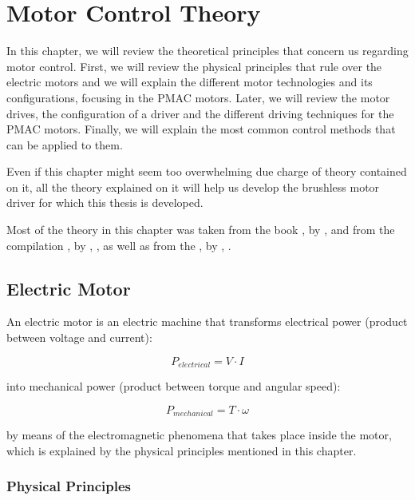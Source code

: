 \chapter{Motor Control Theory} \label{chap:theory}

In this chapter, we will review the theoretical principles that concern us regarding motor control. First, we will review the physical principles that rule over the electric motors and we will explain the different motor technologies and its configurations, focusing in the \acf{PMAC} motors. Later, we will review the motor drives, the configuration of a driver and the different driving techniques for the \ac{PMAC} motors. Finally, we will explain the most common control methods that can be applied to them.

Even if this chapter might seem too overwhelming due charge of theory contained on it, all the theory explained on it will help us develop the brushless motor driver for which this thesis is developed.

Most of the theory in this chapter was taken from the book , by \citeauthor{sistemi_di_controllo:2007}, \citeyear{sistemi_di_controllo:2007} and from the compilation , by \citeauthor{AC_drives}, \citeyear{AC_drives}, as well as from the , by \citeauthor{GhioniPowerElec}, \citeyear{GhioniPowerElec}.


\section{Electric Motor}

An electric motor is an electric machine that transforms electrical power (product between voltage and current):

\begin{equation}
	\label{eq:p_elec}
	P_{electrical} = V \cdot I
\end{equation}

into mechanical power (product between torque and angular speed):

\begin{equation}
	\label{eq:p_mech}
	P_{mechanical} = T \cdot \omega
\end{equation}

by means of the electromagnetic phenomena that takes place inside the motor, which is explained by the physical principles mentioned in this chapter.

\subsection{Physical Principles} \label{physical_principles}

